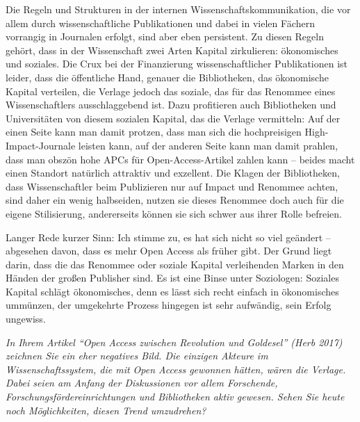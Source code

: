 \documentclass[a4paper,
fontsize=11pt,
oneside,
numbers=noperiodatend,
parskip=half-,
bibliography=totoc,
final
]{scrartcl}
\begin{document}
Die Regeln und Strukturen in der internen Wissenschaftskommunikation,
die vor allem durch wissenschaftliche Publikationen und dabei in vielen
Fächern vorrangig in Journalen erfolgt, sind aber eben persistent. Zu
diesen Regeln gehört, dass in der Wissenschaft zwei Arten Kapital
zirkulieren: ökonomisches und soziales. Die Crux bei der Finanzierung
wissenschaftlicher Publikationen ist leider, dass die öffentliche Hand,
genauer die Bibliotheken, das ökonomische Kapital verteilen, die Verlage
jedoch das soziale, das für das Renommee eines Wissenschaftlers
ausschlaggebend ist. Dazu profitieren auch Bibliotheken und
Universitäten von diesem sozialen Kapital, das die Verlage vermitteln:
Auf der einen Seite kann man damit protzen, dass man sich die
hochpreisigen High-Impact-Journale leisten kann, auf der anderen Seite
kann man damit prahlen, dass man obszön hohe APCs für
Open-Access-Artikel zahlen kann -- beides macht einen Standort natürlich
attraktiv und exzellent. Die Klagen der Bibliotheken, dass
Wissenschaftler beim Publizieren nur auf Impact und Renommee achten,
sind daher ein wenig halbseiden, nutzen sie dieses Renommee doch auch
für die eigene Stilisierung, andererseits können sie sich schwer aus
ihrer Rolle befreien.

Langer Rede kurzer Sinn: Ich stimme zu, es hat sich nicht so viel
geändert -- abgesehen davon, dass es mehr Open Access als früher gibt.
Der Grund liegt darin, dass die das Renommee oder soziale Kapital
verleihenden Marken in den Händen der großen Publisher sind. Es ist eine
Binse unter Soziologen: Soziales Kapital schlägt ökonomisches, denn es
lässt sich recht einfach in ökonomisches ummünzen, der umgekehrte
Prozess hingegen ist sehr aufwändig, sein Erfolg ungewiss.

\emph{In Ihrem Artikel \enquote{Open Access zwischen Revolution und
Goldesel} (Herb 2017) zeichnen Sie ein eher negatives Bild. Die einzigen
Akteure im Wissenschaftssystem, die mit Open Access gewonnen hätten,
wären die Verlage. Dabei seien am Anfang der Diskussionen vor allem
Forschende, Forschungsfördereinrichtungen und Bibliotheken aktiv
gewesen. Sehen Sie heute noch Möglichkeiten, diesen Trend umzudrehen?}
\end{document}
